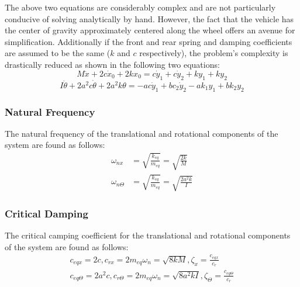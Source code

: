\documentclass[12pt]{article}
\begin{document}
The above two equations are considerably complex and are not particularly conducive of solving analytically by hand. However, the fact that the vehicle has the center of gravity approximately centered along the wheel offers an avenue for simplification. Additionally if the front and rear spring and damping coefficients are assumed to be the same ($k$ and $c$ respectively), the problem's complexity is drastically reduced as shown in the following two equations: 
\begin{equation}
	M \ddot x + 2c\dot x_0 + 2kx_0 = c\dot y_1 + c\dot y_2 + ky_1 + ky_2
\end{equation}
\begin{equation}
	I \ddot\theta + 2a^2c\dot\theta + 2a^2k\theta = -ac\dot y_1 + bc_2\dot y_2 - ak_1y_1 + bk_2y_2
\end{equation}

\subsubsection{Natural Frequency}
The natural frequency of the translational and rotational components of the system are found as follows: 
\begin{equation}
	\begin{split}
	\omega _{nx} &= \sqrt{\frac{k_{eq}}{m_{eq}}} = \sqrt{\frac{2k}{M}}\\
	\omega _{n\Theta} &= \sqrt{\frac{k_{eq}}{m_{eq}}}= \sqrt{\frac{2a^2k}{I}}
	\end{split}  
\end{equation}

\subsubsection{Critical Damping}
The critical camping coefficient for the translational and rotational components of the system are found as follows:
\begin{equation}
	\begin{split}
	c_{eqx} = 2c, c_{rx} = 2m_{eq}\omega _n = \sqrt{8kM}, \zeta _x = \frac{c_{eqx}}{c_r}\\
	c_{eq\Theta} = 2a^2c, c_{r\Theta} = 2m_{eq}\omega _n = \sqrt{8a^2kI}, \zeta _\Theta = \frac{c_{eq\Theta}}{c_r}
	\end{split}  
\end{equation}
\end{document}
